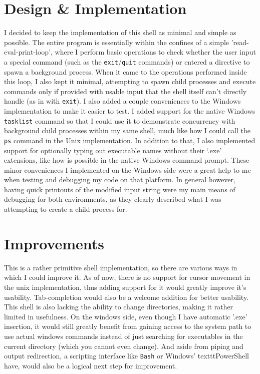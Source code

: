 \documentclass[12pt]{article}
\begin{document}
\section*{Design \& Implementation}
I decided to keep the implementation of this shell as minimal and simple as possible. The entire program is essentially within the
confines of a simple 'read-eval-print-loop', where I perform basic operations to check whether the user input a special command (such as the
\texttt{exit}/\texttt{quit} commands) or entered a directive to spawn a background process. When it came to the operations performed inside 
this loop, I also kept it minimal, attempting to spawn child processes and execute commands only if provided with usable input that the shell itself 
can't directly handle (as in with \texttt{exit}). I also added a couple conveniences to the Windows implementation to make it easier to test. I added 
support for the native Windows \texttt{tasklist} command so that I could use it to demonstrate concurrency with background child processes within my 
same shell, much like how I could call the \texttt{ps} command in the Unix implementation. In addition to that, I also implemented support for optionally 
typing out executable names without their `.exe' extensions, like how is possible in the native Windows command prompt.
These minor conveniences I implemented on the Windows side were a great help to me when testing and debugging my code on that platform. In general however,
having quick printouts of the modified input string were my main means of debugging for both environments, as they clearly described what I was attempting
to create a child process for. 

\section*{Improvements}
This is a rather primitive shell implementation, so there are various ways in which I could improve it. As of now, there is no support for cursor movement
in the unix implementation, thus adding support for it would greatly improve it's usability. Tab-completion would also be a welcome addition for better 
usability. This shell is also lacking the ability to change directories, making it rather limited in usefulness. On the windows side, even though I have
automatic '.exe' insertion, it would still greatly benefit from gaining access to the system path to use actual windows commands instead of just searching
for executables in the current directory (which you cannot even change). And aside from piping and output redirection, a scripting interface like \texttt{Bash} or 
Windows' texttt{PowerShell} have, would also be a logical next step for improvement.
\end{document}
